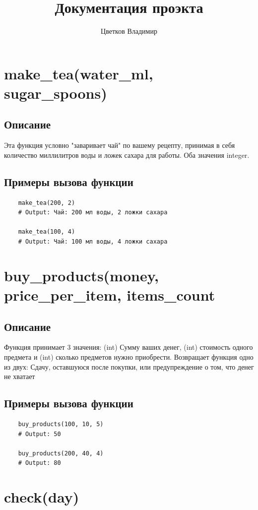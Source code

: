 \documentclass{article}
\title{Документация проэкта}
\author{Цветков Владимир}
\begin{document}
\maketitle

\section{make\_tea(water\_ml, sugar\_spoons)}

\subsection{Описание}
Эта функция условно "заваривает чай" по вашему рецепту, принимая в себя количество миллилитров воды и ложек сахара для работы. Оба значения integer.

\subsection{Примеры вызова функции}

\begin{verbatim}
    make_tea(200, 2)
    # Output: Чай: 200 мл воды, 2 ложки сахара

    make_tea(100, 4)
    # Output: Чай: 100 мл воды, 4 ложки сахара
\end{verbatim}

\section{buy\_products(money, price\_per\_item, items\_count}
\subsection{Описание}
Функция принимает 3 значения: (int) Сумму ваших денег, (int) стоимость одного предмета и (int) сколько предметов нужно приобрести.
Возвращает функция одно из двух: Сдачу, оставшуюся после покупки, или предупреждение о том, что денег не хватает
\subsection{Примеры вызова функции}
\begin{verbatim}
    buy_products(100, 10, 5)
    # Output: 50

    buy_products(200, 40, 4)
    # Output: 80
\end{verbatim}

\section{check(day)}
\end{document}
